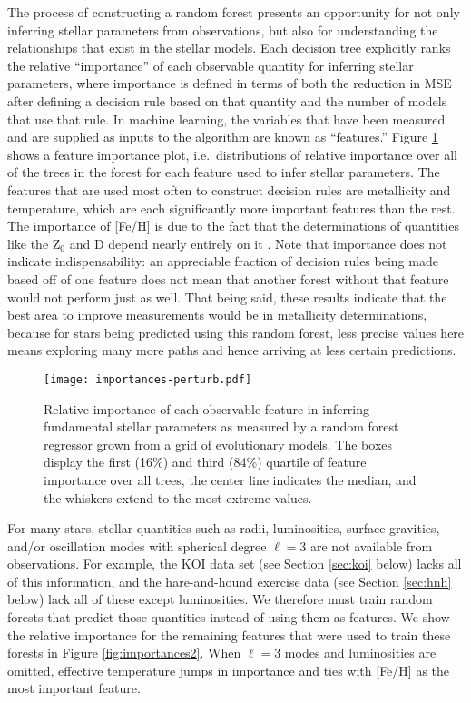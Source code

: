 \documentclass[manuscript,linenumbers]{aastex6}
\newcommand{\colwidth}{0.5\textwidth}
\newif\ifref
\newcommand{\mb}[1]{\ifref\boldmath\textbf{#1}\unboldmath\else #1\fi}
\begin{document}
\mb{The process of constructing a random forest} presents an opportunity for not only inferring stellar parameters from observations, but also for understanding the relationships that exist in the \mb{stellar models}. Each decision tree explicitly ranks the relative ``importance'' of each observable quantity \mb{for inferring stellar parameters}, where importance is defined in terms of both the reduction in MSE after defining a decision rule based on that quantity and the number of models that use that rule. \mb{In machine learning, the variables that have been measured and are supplied as inputs to the algorithm are known as ``features.'' Figure \ref{fig:importances} shows a feature importance plot, i.e.~distributions of relative importance over all of the trees in the forest for each feature used to infer stellar parameters. The features that are used most often to construct decision rules are metallicity and temperature, which are each significantly more important features than the rest.} The importance of [Fe/H] is due to the fact that the determinations of quantities like the Z$_0$ and D depend nearly entirely on it \citep[see also][]{main-sequence-stats}. Note that importance does not indicate indispensability: an appreciable fraction of decision rules being made based off of \mb{one feature} does not mean that another forest without that \mb{feature} would not perform just as well. That being said, these results indicate that the best area to improve measurements would be in metallicity determinations, because for stars being predicted using this random forest, less precise values here means exploring many more paths and hence arriving at less certain predictions. 

\begin{figure}
    \centering
    \texttt{[image: importances-perturb.pdf]}
    \caption{Relative importance of each observable feature in inferring fundamental stellar parameters as measured by a random forest regressor grown from a grid of evolutionary models. The boxes display the first (16\%) and third (84\%) quartile of feature importance over all trees, the center line indicates the median, and the whiskers extend to the most extreme values.}
    \label{fig:importances}
\end{figure}

For many stars, \mb{stellar quantities} such as radii, luminosities, surface gravities, and/or oscillation modes with spherical degree $\ell=3$ are not available from observations. For example, the KOI data set \mb{(see Section \ref{sec:koi} below)} lacks all of this information, and the hare-and-hound exercise data \mb{(see Section \ref{sec:hnh} below)} lack all of these except luminosities. We therefore must train random forests that predict those quantities instead of using them as \mb{features}. We show the relative importance for \mb{the remaining features that were} used to train these forests in Figure \ref{fig:importances2}. When $\ell=3$ modes and luminosities are omitted, effective temperature jumps in importance and ties with [Fe/H] as the most \mb{important feature}. 
\end{document}
